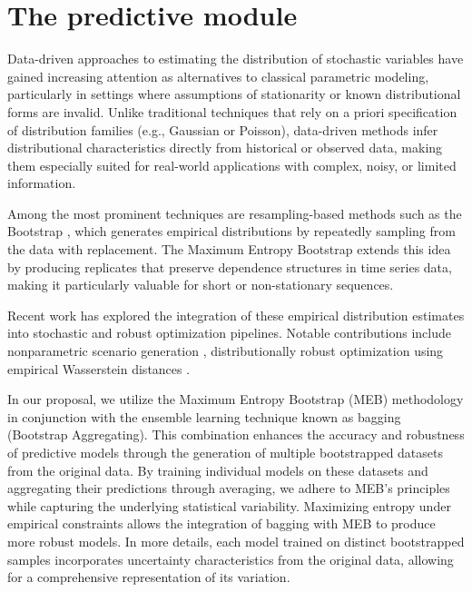 \documentclass[ijoc,sglanonrev]{informs4}
\begin{document}

\section{The predictive module} \label{Sec:forecasting}


Data-driven approaches to estimating the distribution of stochastic variables have gained increasing attention as alternatives to classical parametric modeling, particularly in settings where assumptions of stationarity or known distributional forms are invalid. Unlike traditional techniques that rely on a priori specification of distribution families (e.g., Gaussian or Poisson), data-driven methods infer distributional characteristics directly from historical or observed data, making them especially suited for real-world applications with complex, noisy, or limited information.

Among the most prominent techniques are resampling-based methods such as the Bootstrap \cite{b1}, which generates empirical distributions by repeatedly sampling from the data with replacement. The Maximum Entropy Bootstrap \cite{Vinod2006} extends this idea by producing replicates that preserve dependence structures in time series data, making it particularly valuable for short or non-stationary sequences.

Recent work has explored the integration of these empirical distribution estimates into stochastic and robust optimization pipelines. Notable contributions include nonparametric scenario generation \cite{BM11}, distributionally robust optimization using empirical Wasserstein distances \cite{EK17}. 

In our proposal, we utilize the Maximum Entropy Bootstrap (MEB) methodology in conjunction with the ensemble learning technique known as bagging (Bootstrap Aggregating). This combination enhances the accuracy and robustness of predictive models through the generation of multiple bootstrapped datasets from the original data. By training individual models on these datasets and aggregating their predictions through averaging, we adhere to MEB's principles while capturing the underlying statistical variability. Maximizing entropy under empirical constraints allows the integration of bagging with MEB to produce more robust models. In more details, each model trained on distinct bootstrapped samples incorporates uncertainty characteristics from the original data, allowing for a comprehensive representation of its variation.
\end{document}
